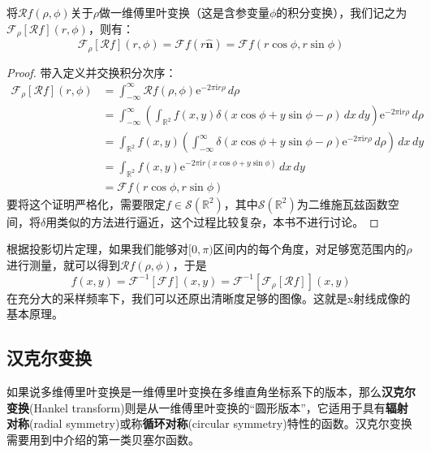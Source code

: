 \begin{theorem}[投影切片定理]
    将$\mathcal{R} f(\rho,\phi)$关于$\rho$做一维傅里叶变换（这是含参变量$\phi$的积分变换），我们记之为$\mathcal{F} _{\rho}[\mathcal{R} f](r,\phi)$，则有：
    \[\mathcal{F} _{\rho}[\mathcal{R} f](r,\phi)=\mathcal{F} f(r\hat{\mathbf{n}})=\mathcal{F} f(r\cos\phi,r\sin\phi)\]
\end{theorem}
\begin{proof}
    带入定义并交换积分次序：
    \begin{align*}
        \mathcal{F} _{\rho}[\mathcal{R} f](r,\phi)&=\int_{-\infty}^{\infty}\mathcal{R} f(\rho,\phi)\mathrm{e}^{-2\pi \mathrm{i} r \rho}\,d\rho\\
        &=\int_{-\infty}^{\infty}\left(\int_{\mathbb{R}^2}f(x,y)\delta(x\cos\phi+y\sin\phi-\rho)\,dx\,dy\right)\mathrm{e}^{-2\pi \mathrm{i} r \rho}\,d\rho\\
        &=\int_{\mathbb{R}^2}f(x,y)\left(\int_{-\infty}^{\infty}\delta(x\cos\phi+y\sin\phi-\rho)\mathrm{e}^{-2\pi \mathrm{i} r \rho}\,d\rho\right)\,dx\,dy\\
        &=\int_{\mathbb{R}^2}f(x,y)\mathrm{e}^{-2\pi \mathrm{i} r (x\cos\phi+y\sin\phi)}\,dx\,dy\\
        &=\mathcal{F} f(r\cos\phi,r\sin\phi)
    \end{align*}
    要将这个证明严格化，需要限定$f\in\mathcal{S} (\mathbb{R}^2)$，其中$\mathcal{S} (\mathbb{R}^2)$为二维施瓦兹函数空间，将$\delta$用类似的方法进行逼近，这个过程比较复杂，本书不进行讨论。
\end{proof}

根据投影切片定理，如果我们能够对$[0,\pi)$区间内的每个角度，对足够宽范围内的$\rho$进行测量，就可以得到$\mathcal{R} f(\rho,\phi)$，于是
\[f(x,y)=\mathcal{F} ^{-1}[\mathcal{F} f](x,y)=\mathcal{F} ^{-1}[\mathcal{F} _{\rho}[\mathcal{R} f]](x,y)\]
在充分大的采样频率下，我们可以还原出清晰度足够的图像。这就是x射线成像的基本原理。

\subsection{汉克尔变换}\label{sub:hankel}

如果说多维傅里叶变换是一维傅里叶变换在多维直角坐标系下的版本，那么\textbf{汉克尔变换}(Hankel transform)则是从一维傅里叶变换的“圆形版本”，它适用于具有\textbf{辐射对称}(radial symmetry)或称\textbf{循环对称}(circular symmetry)特性的函数。汉克尔变换需要用到中介绍的第一类贝塞尔函数。

